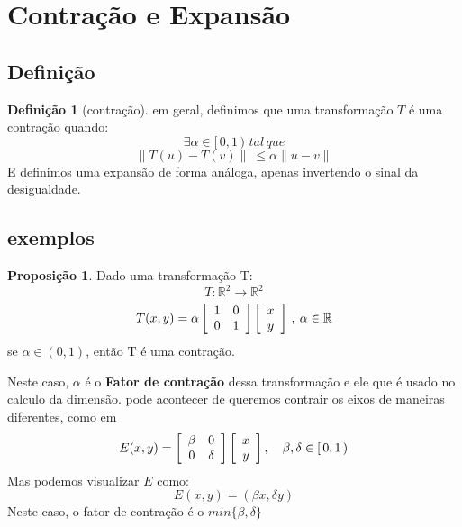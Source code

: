 \documentclass[12pt]{report}
\theoremstyle{definition}
\newtheorem{definition}{Definição}
\newtheorem{proposition}{Proposição}
\begin{document}
\section{Contração e Expansão}
\subsection{Definição}
\begin{definition}[contração]
    em geral, definimos que uma transformação \( T \) é uma contração quando:
        \[ 
        \exists \alpha \in [ \, 0,1\,) \, \, tal\, que
        \]
        \[
        \parallel T(u) - T(v) \parallel \: \leq \alpha \parallel u -v \parallel
        \]
    E definimos uma expansão de forma análoga, apenas invertendo o sinal da desigualdade.
    
\end{definition}

\subsection{exemplos}

\begin{proposition}\label{contract}
    Dado uma transformação T:
    \[
        T: \mathbb{R}^2 \longrightarrow \mathbb{R}^2
    \]
    \begin{equation}\label{escalar}
        T(x, y) = 
          \alpha
          \left[ 
            {
                \begin{array}{c c}
                    1 & 0 \\
                    0 & 1 \\
                \end{array} 
            } 
          \right]
          \left[ 
            {
                \begin{array}{c}
                    x \\
                    y \\
                \end{array} 
                } 
           \right]
           \, , \: \alpha \in \mathbb{R}
    \end{equation}
    se \( \alpha \in (0,1)\), então T é uma contração.
\end{proposition}
Neste caso, \(\alpha\) é o \textbf{Fator de contração} dessa transformação e ele que é usado no calculo da dimensão.
pode acontecer de queremos contrair os eixos de maneiras diferentes, como em
\[
E(x, y) = 
  \left[ 
    {
        \begin{array}{c c}
            \beta & 0      \\
            0     & \delta \\
        \end{array} 
    } 
  \right]
  \left[ 
    {
        \begin{array}{c}
            x \\
            y \\
        \end{array} 
        } 
   \right]
   ,
   \quad \beta,\delta \in [\,0, 1\,)
\]
Mas podemos visualizar \(E\) como:
\[
    E(x,y) = (\beta x, \delta y)
\]
Neste caso, o fator de contração é o \(min\{\beta, \delta\}\)
\end{document}

